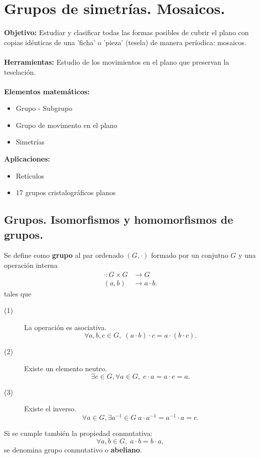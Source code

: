 \chapter{Grupos de simetrías. Mosaicos.}

\textbf{Objetivo:} Estudiar y clasificar todas las formas posibles de cubrir el plano con copias idénticas de una 'ficha' o 'pieza' (tesela) de manera períodica: mosaicos. \\ \\
\textbf{Herramientas:} Estudio de los movimientos en el plano que preservan la teselación. \\ \\
\textbf{Elementos matemáticos:} 
\begin{itemize}
\item Grupo - Subgrupo
\item Grupo de movimento en el plano
\item Simetrías
\end{itemize}
\textbf{Aplicaciones:}
\begin{itemize}
\item Retículos
\item 17 grupos cristalográficos planos
\end{itemize}

\section{Grupos. Isomorfismos y homomorfismos de grupos.}

\begin{fdefinition}[Grupo]
\normalfont Se define como \textbf{grupo} al par ordenado $\displaystyle \left(G, \cdot\right) $ formado por un conjutno $\displaystyle G $ y una operación interna
\[
\begin{split}
	\cdot : G \times G & \to G \\
\left(a,b\right) & \to a \cdot b .
\end{split}
\]
tales que
\begin{description}
\item[(1)] La operación es asociativa. 
	\[\forall a, b, c \in G, \; \left(a \cdot b\right) \cdot c = a \cdot \left(b \cdot c\right) .\]
\item[(2)] Existe un elemento neutro.
	\[\exists e \in G, \forall a \in G, \; e \cdot a = a \cdot e = a .\]
\item[(3)] Existe el inverso. 
	\[\forall a \in G, \exists a^{-1} \in G\; a \cdot a^{-1} = a^{-1} \cdot a = e .\]
\end{description}
Si se cumple también la propiedad conmutativa:
\[\forall a, b \in G, \; a \cdot b = b \cdot a ,\]
se denomina grupo conmutativo o \textbf{abeliano}.
\end{fdefinition}

